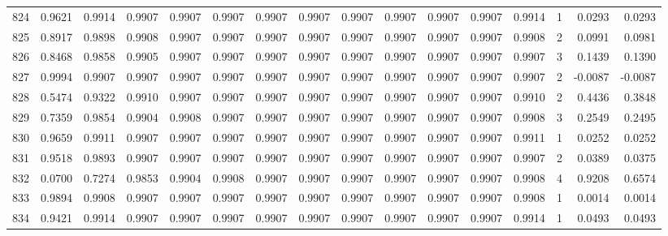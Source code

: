 \begin{tabular}{lrrrrrrrrrrrrrrr}
824 &      0.9621 &  0.9914 &  0.9907 &  0.9907 &  0.9907 &  0.9907 &  0.9907 &  0.9907 &  0.9907 &  0.9907 &   0.9907 &     0.9914 &      1 &                    0.0293 &                     0.0293 \\
825 &      0.8917 &  0.9898 &  0.9908 &  0.9907 &  0.9907 &  0.9907 &  0.9907 &  0.9907 &  0.9907 &  0.9907 &   0.9907 &     0.9908 &      2 &                    0.0991 &                     0.0981 \\
826 &      0.8468 &  0.9858 &  0.9905 &  0.9907 &  0.9907 &  0.9907 &  0.9907 &  0.9907 &  0.9907 &  0.9907 &   0.9907 &     0.9907 &      3 &                    0.1439 &                     0.1390 \\
827 &      0.9994 &  0.9907 &  0.9907 &  0.9907 &  0.9907 &  0.9907 &  0.9907 &  0.9907 &  0.9907 &  0.9907 &   0.9907 &     0.9907 &      2 &                   -0.0087 &                    -0.0087 \\
828 &      0.5474 &  0.9322 &  0.9910 &  0.9907 &  0.9907 &  0.9907 &  0.9907 &  0.9907 &  0.9907 &  0.9907 &   0.9907 &     0.9910 &      2 &                    0.4436 &                     0.3848 \\
829 &      0.7359 &  0.9854 &  0.9904 &  0.9908 &  0.9907 &  0.9907 &  0.9907 &  0.9907 &  0.9907 &  0.9907 &   0.9907 &     0.9908 &      3 &                    0.2549 &                     0.2495 \\
830 &      0.9659 &  0.9911 &  0.9907 &  0.9907 &  0.9907 &  0.9907 &  0.9907 &  0.9907 &  0.9907 &  0.9907 &   0.9907 &     0.9911 &      1 &                    0.0252 &                     0.0252 \\
831 &      0.9518 &  0.9893 &  0.9907 &  0.9907 &  0.9907 &  0.9907 &  0.9907 &  0.9907 &  0.9907 &  0.9907 &   0.9907 &     0.9907 &      2 &                    0.0389 &                     0.0375 \\
832 &      0.0700 &  0.7274 &  0.9853 &  0.9904 &  0.9908 &  0.9907 &  0.9907 &  0.9907 &  0.9907 &  0.9907 &   0.9907 &     0.9908 &      4 &                    0.9208 &                     0.6574 \\
833 &      0.9894 &  0.9908 &  0.9907 &  0.9907 &  0.9907 &  0.9907 &  0.9907 &  0.9907 &  0.9907 &  0.9907 &   0.9907 &     0.9908 &      1 &                    0.0014 &                     0.0014 \\
834 &      0.9421 &  0.9914 &  0.9907 &  0.9907 &  0.9907 &  0.9907 &  0.9907 &  0.9907 &  0.9907 &  0.9907 &   0.9907 &     0.9914 &      1 &                    0.0493 &                     0.0493 \\

\end{tabular}
